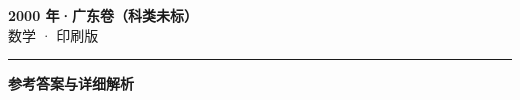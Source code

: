 \documentclass[zihao=5, a4paper]{ctexart}
\begin{document}
\begin{center}
  {\Large\bfseries 2000 年·广东卷（科类未标）}\\[4pt]
  {\large 数学 · 印刷版}
\end{center}
\medskip
{}

\par\bigskip\hrule\bigskip
{}
\begin{center}{\large\bfseries 参考答案与详细解析}\end{center}
\smallskip

\end{document}
